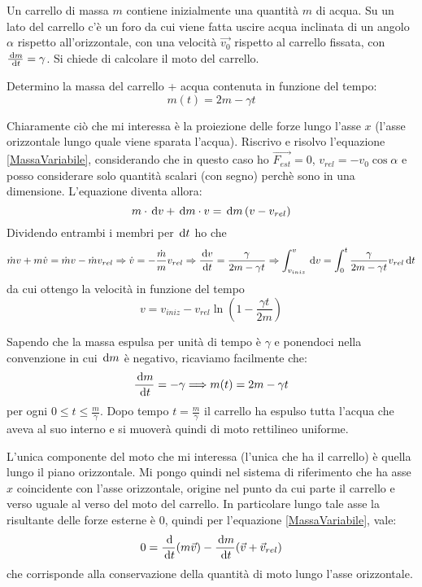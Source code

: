 \documentclass[../main.tex]{subfiles}
\begin{document}

\textex
Un carrello di massa $m$ contiene inizialmente una quantità $m$ di acqua.
Su un lato del carrello c'è un foro da cui viene fatta uscire acqua inclinata di un angolo $\alpha$ rispetto all'orizzontale, con una velocità $\overrightarrow {v_0}$ rispetto al carrello fissata, con $\frac{\,\mathrm{d} m}{\,\mathrm{d} t}=\gamma$.
Si chiede di calcolare il moto del carrello.


\solution
Determino la massa del carrello + acqua contenuta in funzione del tempo:
\begin{equation*}\label{csa:MassaTempo}
m(t) = 2m-\gamma t
\end{equation*}

Chiaramente ciò che mi interessa è la proiezione delle forze lungo l'asse $x$ (l'asse orizzontale lungo quale viene sparata l'acqua). Riscrivo e risolvo l'equazione \cref{MassaVariabile},  considerando che in questo caso ho $\overrightarrow{F_{est}}=0$,  $v_{rel} = -v_0\cos\alpha$ e posso considerare solo quantità scalari (con segno) perchè sono in una dimensione.
L'equazione diventa allora:
\begin{equation*}
m\cdot \,\mathrm{d} v + \,\mathrm{d} m \cdot v = \,\mathrm{d} m\left ( v - v_{rel}\right )
\end{equation*}
Dividendo entrambi i membri per $\,\mathrm{d} t$ ho che 
\begin{equation*}
\dot m v + m\dot v = \dot m v - \dot m v_{rel}\Rightarrow \dot v = - \frac{\dot m}{m}v_{rel} \Rightarrow 
\frac{\,\mathrm{d} v}{\,\mathrm{d} t} = \frac{\gamma}{2m-\gamma t} \Rightarrow \int_{v_{iniz}}^{v} \,\mathrm{d} v = \int_{0}^{t}\frac{\gamma}{2m-\gamma t}v_{rel}\,\mathrm{d} t
\end{equation*}
da cui ottengo la velocità in funzione del tempo
\begin{equation*}
v = v_{iniz} -v_{rel}\ln \left ( 1-\frac{\gamma t}{2m}\right )
\end{equation*}

\solution[2]
Sapendo che la massa espulsa per unità di tempo è $\gamma$ e ponendoci nella convenzione in cui $\,\mathrm{d} m$ è negativo, ricaviamo facilmente che:
\begin{equation*}
	\frac{\,\mathrm{d} m}{\,\mathrm{d} t}=-\gamma \Longrightarrow m(t)=2m-\gamma t
\end{equation*}
per ogni $0\le t \le \frac{m}{\gamma}$. Dopo tempo $t=\frac{m}{\gamma}$ il carrello ha espulso tutta l'acqua che aveva al suo interno e si muoverà quindi di moto rettilineo uniforme.

L'unica componente del moto che mi interessa (l'unica che ha il carrello) è quella lungo il piano orizzontale. Mi pongo quindi nel sistema di riferimento che ha asse $x$ coincidente con l'asse orizzontale, origine nel punto da cui parte il carrello e verso uguale al verso del moto del carrello.
In particolare lungo tale asse la risultante delle forze esterne è 0, quindi per l'equazione \cref{MassaVariabile}, vale:
\begin{equation*}
	0=\frac{\,\mathrm{d}}{\,\mathrm{d} t} (m\vec v)-\frac{\,\mathrm{d} m}{\,\mathrm{d} t}(\vec v+\vec{v}_{rel})
\end{equation*}
che corrisponde alla conservazione della quantità di moto lungo l'asse orizzontale.
\end{document}
